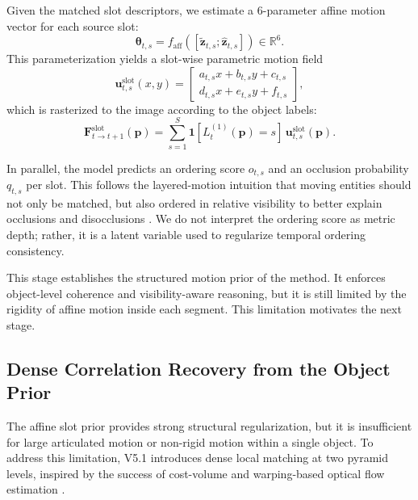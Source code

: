 Given the matched slot descriptors, we estimate a 6-parameter affine motion vector for each source slot:
\begin{equation}
\boldsymbol{\theta}_{t,s} = f_{\mathrm{aff}}\left([\tilde{\mathbf{z}}_{t,s};\hat{\mathbf{z}}_{t,s}]\right) \in \mathbb{R}^{6}.
\end{equation}
This parameterization yields a slot-wise parametric motion field
\begin{equation}
\mathbf{u}_{t,s}^{\mathrm{slot}}(x,y) =
\begin{bmatrix}
a_{t,s}x + b_{t,s}y + c_{t,s}\\
d_{t,s}x + e_{t,s}y + f_{t,s}
\end{bmatrix},
\end{equation}
which is rasterized to the image according to the object labels:
\begin{equation}
\mathbf{F}^{\mathrm{slot}}_{t\rightarrow t+1}(\mathbf{p}) = \sum_{s=1}^{S} \mathbf{1}[L_t^{(1)}(\mathbf{p})=s] \, \mathbf{u}_{t,s}^{\mathrm{slot}}(\mathbf{p}).
\end{equation}

In parallel, the model predicts an ordering score $o_{t,s}$ and an occlusion probability $q_{t,s}$ per slot. This follows the layered-motion intuition that moving entities should not only be matched, but also ordered in relative visibility to better explain occlusions and disocclusions \cite{wang1994representing,sevillalara2016optical}. We do not interpret the ordering score as metric depth; rather, it is a latent variable used to regularize temporal ordering consistency.

This stage establishes the structured motion prior of the method. It enforces object-level coherence and visibility-aware reasoning, but it is still limited by the rigidity of affine motion inside each segment. This limitation motivates the next stage.

\subsection{Dense Correlation Recovery from the Object Prior}

The affine slot prior provides strong structural regularization, but it is insufficient for large articulated motion or non-rigid motion within a single object. To address this limitation, V5.1 introduces dense local matching at two pyramid levels, inspired by the success of cost-volume and warping-based optical flow estimation \cite{sun2018pwcnet,teed2020raft,huang2022flowformer}.

